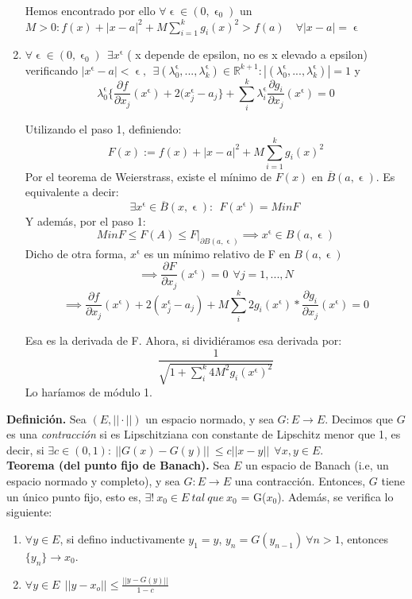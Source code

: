 \documentclass[11pt, a4paper, titlepage]{article}
\makeatletter
\let\epsilon\upvarepsilon
\renewenvironment{proof}[1][\proofname] {\vspace{-15pt}\par\pushQED{\qed}\normalfont\topsep6\p@\@plus6\p@\relax\trivlist\item[\hskip\labelsep\it#1\@addpunct{.}]\ignorespaces}{\popQED\endtrivlist\@endpefalse}
\theoremstyle{theorem-style}
\theoremstyle{definition-style}
\theoremstyle{remark-style}
\theoremstyle{example-style}
\newenvironment{nlist}
{\begin{enumerate}
\renewcommand\labelenumi{(\emph{\roman{enumi})}}}
{\end{enumerate}}
\makeatother
\begin{document}
\begin{proof}
\begin{enumerate}
	
	Hemos encontrado por ello $\forall \epsilon \in (0,\epsilon_0)$ un $M>0: f(x) + |x-a|^2 + M \sum_{i=1}^kg_i(x)^2 > f(a) \quad \forall |x-a|= \upvarepsilon$
	\item  $\forall \epsilon \in (0,\epsilon_0) \ \ \exists x^\epsilon$ ( x depende de epsilon, no es x elevado a epsilon) verificando $|x^\epsilon -a| < \epsilon, \ \ \exists(\lambda_0^\epsilon,...,\lambda_k^\epsilon)\in \mathbb{R}^{k+1} : |(\lambda_0^{\epsilon},...,\lambda_k^\epsilon)|= 1$ y $$\lambda_0^\epsilon\{\frac{\partial f}{\partial x_j}(x^\epsilon) + 2(x_j^\epsilon -a_j\}+ \sum_i^k \lambda_i^\epsilon \frac{\partial g_i}{\partial x_j}(x^\epsilon) = 0$$
	
	Utilizando el paso 1, definiendo:
	\[
	F(x):=f(x) + |x-a|^2 + M \sum_{i=1}^kg_i(x)^2
	\]
	Por el teorema de Weierstrass, existe el mínimo de $F(x)$ en $\overline{B}(a,\epsilon)$. Es equivalente a decir:
	\[
	\exists x^\epsilon \in \overline{B}(x,\epsilon) : \ \ F(x^\epsilon)= Min F \ 
	\]
	Y además, por el paso 1:
	\[
	Min F \leq F(A) \leq F|_{\partial B(a,\epsilon)} \implies x^\epsilon \in B(a,\epsilon)
	\]
	Dicho de otra forma, $x^\epsilon$ es un mínimo relativo de F en $B(a,\epsilon)$
	\[
	 \implies \frac{\partial F}{\partial x_j}(x^\epsilon) = 0 \ \ \forall j=1,...,N
	 \]
	 \[
	 \implies \frac{\partial f}{\partial x_j}(x^\epsilon) + 2(x_j^\epsilon -a_j) + M \sum_i^k 2 g_i(x^\epsilon)*\frac{\partial g_i}{\partial x_j}(x^\epsilon) = 0
	 \]
	
	Esa es la derivada de F. Ahora, si dividiéramos esa derivada por:
	\[
	\frac{1}{\sqrt{1+\sum_i^k4M^2g_i(x^\epsilon)^2}}
	\]
	Lo haríamos de módulo 1.
\end{enumerate}
\end{proof}

\textbf{Definición.} Sea $(E,||\cdot||)$ un espacio normado, y sea $G: E \longrightarrow E$. Decimos que $G$ es una \textit{contracción} si es Lipschitziana con constante de Lipschitz menor que 1, es decir, si $\exists c \in (0,1): \ || G(x) - G(y) || \ \le c||x-y|| \ \ \forall x, y \in E$.\\

\textbf{Teorema (del punto fijo de Banach).}
Sea $E$ un espacio de Banach (i.e, un espacio normado y completo), y sea $G:E\longrightarrow E$ una contracción. Entonces, $G$ tiene un único punto fijo, esto es, $\exists !\ x_0 \in E\ tal\ que\ x_0$ = G($x_0$). Además, se verifica lo siguiente: 

\begin{nlist}
\item $\forall y \in E$, si defino inductivamente $y_1 = y$, $y_n = G(y_{n-1})\ \forall n > 1$, entonces $\{y_n\} \rightarrow x_0$. 
\item  $\displaystyle \forall y \in E \ \ ||y - x_o|| \le \frac{||y-G(y)||}{1-c}$
\end{nlist}
\vspace{1em}
\end{document}
